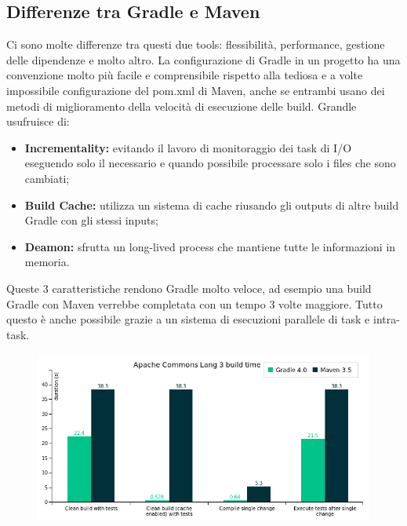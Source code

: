 \subsection{Differenze tra Gradle e Maven} %
Ci sono molte differenze tra questi due tools: flessibilità, performance, gestione delle dipendenze e molto altro. La configurazione di Gradle in un progetto ha una convenzione molto più facile e comprensibile rispetto alla tediosa e a volte impossibile configurazione del pom.xml di Maven, anche se entrambi usano dei metodi di miglioramento della velocità di esecuzione delle build. Grandle usufruisce di:
\begin{itemize}
    \item \textbf{Incrementality:} evitando il lavoro di monitoraggio dei task di I/O eseguendo solo il necessario e quando possibile processare solo i files che sono cambiati;
    \item \textbf{Build Cache:} utilizza un sistema di cache riusando gli outputs di altre build Gradle con gli stessi inputs;
    \item \textbf{Deamon:} sfrutta un long-lived process che mantiene tutte le informazioni in memoria.
\end{itemize}
Queste 3 caratteristiche rendono Gradle molto veloce, ad esempio una build Gradle con Maven verrebbe completata con un tempo 3 volte maggiore. Tutto questo è anche possibile grazie a un sistema di esecuzioni parallele di task e intra-task.
\begin{figure}[H]
\includegraphics[scale=0.70]{0introduction/gradle/performance.png}
\end{figure} 
